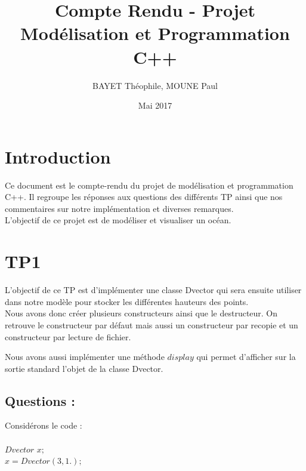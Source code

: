 \documentclass{article}
\title{Compte Rendu - Projet Modélisation et Programmation C++}
\author{BAYET Théophile, MOUNE Paul}
\date{Mai 2017}
\begin{document}
\maketitle

\vspace{1.5cm}

\tableofcontents

\vspace{1.5cm}

\section{Introduction}

Ce document est le compte-rendu du projet de modélisation et programmation C++. Il regroupe les réponses aux questions des
différents TP ainsi que nos commentaires sur notre implémentation et diverses remarques. \\
L'objectif de ce projet est de modéliser et visualiser un océan.

\vspace{1cm}

\section{TP1}

L'objectif de ce TP est d'implémenter une classe Dvector qui sera ensuite utiliser dans notre modèle pour stocker les différentes hauteurs des points. \\

Nous avons donc créer plusieurs constructeurs ainsi que le destructeur. On retrouve le constructeur par défaut mais aussi un constructeur par recopie et un constructeur par lecture de fichier.

Nous avons aussi implémenter une méthode $display$ qui permet d'afficher sur la sortie standard l'objet de la classe Dvector.

\vspace{0.5cm}

\subsection{Questions :}

Considérons le code : \\ \\ $Dvector$ $x;$ \\ $x = Dvector(3, 1.);$ \\ \\
\end{document}

